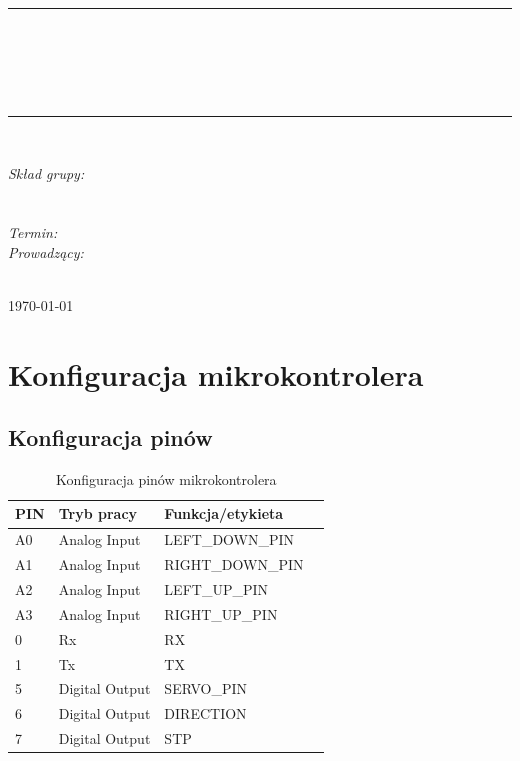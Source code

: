\documentclass[10pt, a4paper]{article}
\begin{document}
\def\tablename{Tabela}	%

\begin{titlepage}
	\begin{center}
		\textsc{\LARGE \formakursu}\\[1cm]		
		\textsc{\Large \kurs}\\[0.5cm]		
		\rule{\textwidth}{0.08cm}\\[0.4cm]
		{\huge \bfseries \doctype}\\[1cm]
		{\huge \bfseries \projectname}\\[0.5cm]
		{\huge \bfseries \acronim}\\[0.4cm]
		\rule{\textwidth}{0.08cm}\\[1cm]
		
		\begin{flushright} \large
		\emph{Skład grupy:}\\
		\osobaA\\
		\osobaB\\[0.4cm]
		
		\emph{Termin: }\termin\\[0.4cm]

		\emph{Prowadzący:} \\
		\prowadzacy \\
		
		\end{flushright}
		
		\vfill
		
		{\large \today}
	\end{center}	
\end{titlepage}

\newpage
\tableofcontents
\newpage

\section{Konfiguracja mikrokontrolera}
\subsection{Konfiguracja pinów}

\begin{table}[H]
	\centering
	\begin{tabular}{|l|l|l|l|}
		\hline
		PIN & Tryb pracy & Funkcja/etykieta\\
		\hline
		A0& Analog Input & LEFT\_DOWN\_PIN \\
		A1& Analog Input & RIGHT\_DOWN\_PIN \\
		A2& Analog Input & LEFT\_UP\_PIN \\
		A3& Analog Input & RIGHT\_UP\_PIN \\
		0& Rx & RX \\
		1& Tx & TX \\
		5& Digital Output & SERVO\_PIN \\
		6& Digital Output & DIRECTION \\
		7& Digital Output & STP \\
		\hline
	\end{tabular}
	\caption{Konfiguracja pinów mikrokontrolera}
\end{table}
\end{document}
